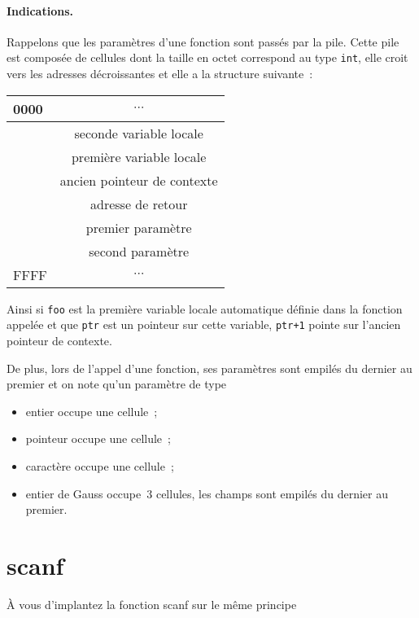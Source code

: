 \paragraph{Indications.}
Rappelons que les param\`etres d'une fonction sont pass\'es par la
pile. Cette pile est compos\'ee de cellules dont la taille en octet
correspond au type \verb?int?, elle croit vers les adresses
d\'ecroissantes et elle a la structure suivante~:
\begin{center}
  \begin{tabular}{l|c|}
    \hline 
    0000 & $\cdots$ \\ \hline
    & seconde variable locale \\ \hline
    & premi\`ere variable locale \\ \hline
    & ancien pointeur de contexte \\ \hline
    & adresse de retour \\ \hline
    & premier param\`etre \\ \hline
    & second param\`etre \\ \hline
    FFFF &$\cdots$ \\ \hline
  \end{tabular}
\end{center}
Ainsi si \verb?foo? est la premi\`ere variable locale automatique
d\'efinie dans la fonction appel\'ee et que \verb?ptr?  est un
pointeur sur cette variable, \verb?ptr+1? pointe sur l'ancien pointeur
de contexte.
\par
De plus, lors de l'appel d'une fonction, ses param\`etres sont
empil\'es du dernier au premier et on note qu'un param\`etre de type
\begin{itemize}
\item entier occupe une cellule~;
\item pointeur occupe une cellule~;
\item caract\`ere occupe une cellule~;
\item entier de Gauss occupe~$3$ cellules, les champs sont empil\'es
  du dernier au premier.
\end{itemize}
\section{scanf}
\`A vous d'implantez la fonction scanf sur le m\^eme principe
